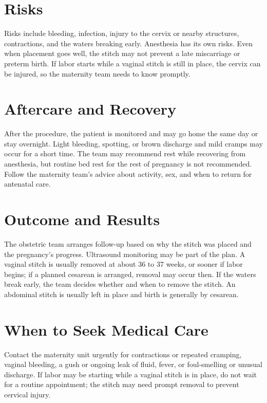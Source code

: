 \section*{Risks}
Risks include bleeding, infection, injury to the cervix or nearby structures, contractions, and the waters breaking early. Anesthesia has its own risks. Even when placement goes well, the stitch may not prevent a late miscarriage or preterm birth. If labor starts while a vaginal stitch is still in place, the cervix can be injured, so the maternity team needs to know promptly.

\section*{Aftercare and Recovery}
After the procedure, the patient is monitored and may go home the same day or stay overnight. Light bleeding, spotting, or brown discharge and mild cramps may occur for a short time. The team may recommend rest while recovering from anesthesia, but routine bed rest for the rest of pregnancy is not recommended. Follow the maternity team's advice about activity, sex, and when to return for antenatal care.

\section*{Outcome and Results}
The obstetric team arranges follow-up based on why the stitch was placed and the pregnancy's progress. Ultrasound monitoring may be part of the plan. A vaginal stitch is usually removed at about 36 to 37 weeks, or sooner if labor begins; if a planned cesarean is arranged, removal may occur then. If the waters break early, the team decides whether and when to remove the stitch. An abdominal stitch is usually left in place and birth is generally by cesarean.

\section*{When to Seek Medical Care}
Contact the maternity unit urgently for contractions or repeated cramping, vaginal bleeding, a gush or ongoing leak of fluid, fever, or foul-smelling or unusual discharge. If labor may be starting while a vaginal stitch is in place, do not wait for a routine appointment; the stitch may need prompt removal to prevent cervical injury.

